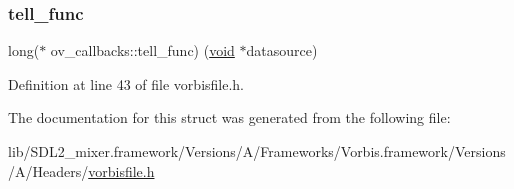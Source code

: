 \subsubsection{\texorpdfstring{tell\_func}{tell\_func}}
{\footnotesize\ttfamily long($\ast$ ov\+\_\+callbacks\+::tell\+\_\+func) (\mbox{\hyperlink{_s_d_l__opengles2__gl2ext_8h_ae5d8fa23ad07c48bb609509eae494c95}{void}} $\ast$datasource)}



Definition at line 43 of file vorbisfile.\+h.



The documentation for this struct was generated from the following file\+:\begin{DoxyCompactItemize}
\item 
lib/\+S\+D\+L2\+\_\+mixer.\+framework/\+Versions/\+A/\+Frameworks/\+Vorbis.\+framework/\+Versions/\+A/\+Headers/\mbox{\hyperlink{vorbisfile_8h}{vorbisfile.\+h}}\end{DoxyCompactItemize}
